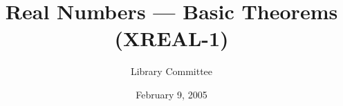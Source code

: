 \documentclass{article}
\title{Real Numbers --- Basic Theorems (XREAL-1)}
\author{Library Committee}
\date{February 9, 2005}
\begin{document}
\maketitle

\begin{thm}
\item\label{xreal1:1} 
\item\label{xreal1:2} 
\item\label{xreal1:3} 
\item\label{xreal1:4} 
\item\label{xreal1:5} 
\item\label{xreal1:6} 
\item\label{xreal1:7} 
\item\label{xreal1:8} 
\item\label{xreal1:9} 
\item\label{xreal1:10} 
\item\label{xreal1:11} 
\item\label{xreal1:12} 
\item\label{xreal1:13} 
\item\label{xreal1:14} 
\item\label{xreal1:15} 
\item\label{xreal1:16} 
\item\label{xreal1:17} 
\item\label{xreal1:18} 
\item\label{xreal1:19} 
\item\label{xreal1:20} 
\item\label{xreal1:21} 
\item\label{xreal1:22} 
\item\label{xreal1:23} 
\item\label{xreal1:24} 
\item\label{xreal1:25} 
\item\label{xreal1:26} 
\item\label{xreal1:27} 
\item\label{xreal1:28} 
\item\label{xreal1:29} 
\item\label{xreal1:30} 
\item\label{xreal1:31} 
\item\label{xreal1:32} 
\item\label{xreal1:33} 
\item\label{xreal1:34} 
\item\label{xreal1:35} 
\item\label{xreal1:36} 
\item\label{xreal1:37} 

\end{thm}
\end{document}
